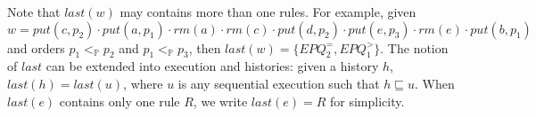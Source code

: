 Note that $\textit{last}(w)$ may contains more than one rules. For example, given $w = \textit{put}(c,p_2) \cdot \textit{put}(a,p_1) \cdot \textit{rm}(a) \cdot \textit{rm}(c) \cdot \textit{put}(d,p_2) \cdot \textit{put}(e,p_3) \cdot \textit{rm}(e) \cdot \textit{put}(b,p_1)$ and orders $p_1 <_{\mathbb{P}} p_2$ and $p_1 <_{\mathbb{P}} p_3$, then $\textit{last}(w) = \{  \textit{EPQ}_2^{=}, \textit{EPQ}_1^{>} \}$. The notion of $\textit{last}$ can be extended into execution and histories: given a history $h$, $\textit{last}(h) = \textit{last}(u)$, where $u$ is any sequential execution such that $h \sqsubseteq u$. When $\textit{last}(e)$ contains only one rule $R$, we write $\textit{last}(e)=R$ for simplicity.
